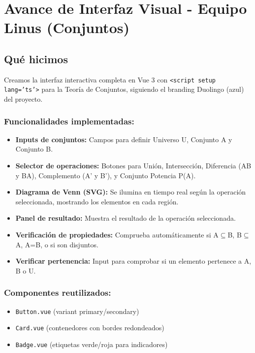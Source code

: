 \documentclass[11pt,a4paper,openany]{book}
\begin{document}
\section{Avance de Interfaz Visual - Equipo Linus (Conjuntos)}

\subsection{Qué hicimos}
Creamos la interfaz interactiva completa en Vue 3 con \texttt{<script setup lang='ts'>} para la Teoría de Conjuntos, siguiendo el branding Duolingo (azul) del proyecto.

\subsubsection{Funcionalidades implementadas:}
\begin{itemize}[leftmargin=*]
\item \textbf{Inputs de conjuntos:} Campos para definir Universo U, Conjunto A y Conjunto B.
\item \textbf{Selector de operaciones:} Botones para Unión, Intersección, Diferencia (AB y BA), Complemento (A' y B'), y Conjunto Potencia P(A).
\item \textbf{Diagrama de Venn (SVG):} Se ilumina en tiempo real según la operación seleccionada, mostrando los elementos en cada región.
\item \textbf{Panel de resultado:} Muestra el resultado de la operación seleccionada.
\item \textbf{Verificación de propiedades:} Comprueba automáticamente si A$ \subseteq $B, B$ \subseteq $A, A=B, o si son disjuntos.
\item \textbf{Verificar pertenencia:} Input para comprobar si un elemento pertenece a A, B o U.
\end{itemize}

\subsubsection{Componentes reutilizados:}
\begin{itemize}[leftmargin=*]
\item \texttt{Button.vue} (variant primary/secondary)
\item \texttt{Card.vue} (contenedores con bordes redondeados)
\item \texttt{Badge.vue} (etiquetas verde/roja para indicadores)
\end{itemize}
\end{document}
